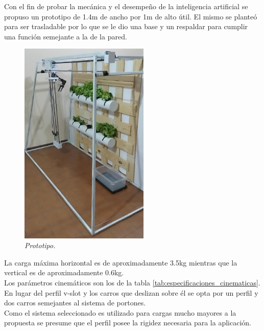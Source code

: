Con el fin de probar la mecánica y el desempeño de la inteligencia artificial se propuso un prototipo de 1.4m de ancho por 1m de alto útil. El mismo se planteó para ser trasladable por lo que se le dio una base y un respaldar para cumplir una función semejante a la de la pared.
\begin{figure}[H]
    \centering
        \includegraphics[width=0.55\textwidth]{img/estructura.jpg}
        \caption{\textit{Prototipo.}}
        \label{fig:estructura}
\end{figure}
La carga máxima horizontal es de aproximadamente 3.5kg mientras que la vertical es de aproximadamente 0.6kg.\\
Los parámetros cinemáticos son los de la tabla \ref{tab:especificaciones_cinematicas}.\\
En lugar del perfil v-slot y los carros que deslizan sobre él se opta por un perfil y dos carros semejantes al sistema de portones.\\
Como el sistema seleccionado es utilizado para cargas mucho mayores a la propuesta se presume que el perfil posee la rigidez necesaria para la aplicación.
